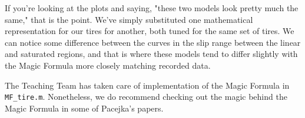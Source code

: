 If you're looking at the plots and saying, "these two models look pretty much the same," that is the point.  We've simply substituted one mathematical representation for our tires for another, both tuned for the same set of tires. We can notice some difference between the curves in the slip range between the linear and saturated regions, and that is where these models tend to differ slightly with the Magic Formula more closely matching recorded data. 

The Teaching Team has taken care of implementation of the Magic Formula in \verb!MF_tire.m!.  Nonetheless, we do recommend checking out the magic behind the Magic Formula in some of Pacejka's papers.
